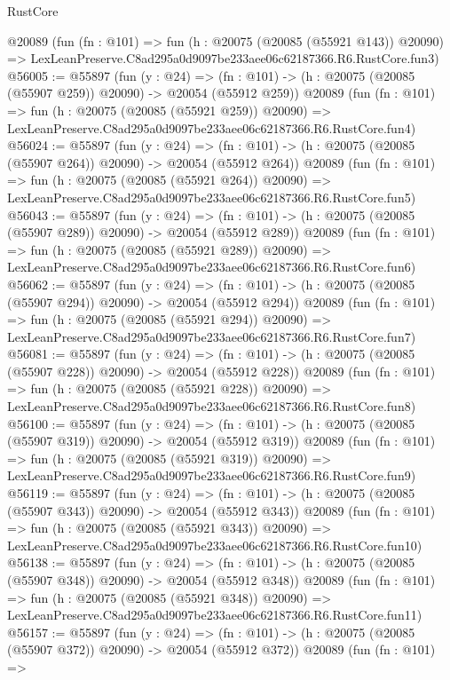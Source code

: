 \begin{lexlean}{RustCore}
\begin{coremodule}
    @20089
    (fun (fn : @101) =>
    fun (h : @20075 (@20085 (@55921 @143)) @20090) =>
    LexLeanPreserve.C8ad295a0d9097be233aee06c62187366.R6.RustCore.fun3)
@56005 := @55897
    (fun (y : @24) =>
    (fn : @101) -> (h : @20075 (@20085 (@55907 @259)) @20090) -> @20054 (@55912 @259))
    @20089
    (fun (fn : @101) =>
    fun (h : @20075 (@20085 (@55921 @259)) @20090) =>
    LexLeanPreserve.C8ad295a0d9097be233aee06c62187366.R6.RustCore.fun4)
@56024 := @55897
    (fun (y : @24) =>
    (fn : @101) -> (h : @20075 (@20085 (@55907 @264)) @20090) -> @20054 (@55912 @264))
    @20089
    (fun (fn : @101) =>
    fun (h : @20075 (@20085 (@55921 @264)) @20090) =>
    LexLeanPreserve.C8ad295a0d9097be233aee06c62187366.R6.RustCore.fun5)
@56043 := @55897
    (fun (y : @24) =>
    (fn : @101) -> (h : @20075 (@20085 (@55907 @289)) @20090) -> @20054 (@55912 @289))
    @20089
    (fun (fn : @101) =>
    fun (h : @20075 (@20085 (@55921 @289)) @20090) =>
    LexLeanPreserve.C8ad295a0d9097be233aee06c62187366.R6.RustCore.fun6)
@56062 := @55897
    (fun (y : @24) =>
    (fn : @101) -> (h : @20075 (@20085 (@55907 @294)) @20090) -> @20054 (@55912 @294))
    @20089
    (fun (fn : @101) =>
    fun (h : @20075 (@20085 (@55921 @294)) @20090) =>
    LexLeanPreserve.C8ad295a0d9097be233aee06c62187366.R6.RustCore.fun7)
@56081 := @55897
    (fun (y : @24) =>
    (fn : @101) -> (h : @20075 (@20085 (@55907 @228)) @20090) -> @20054 (@55912 @228))
    @20089
    (fun (fn : @101) =>
    fun (h : @20075 (@20085 (@55921 @228)) @20090) =>
    LexLeanPreserve.C8ad295a0d9097be233aee06c62187366.R6.RustCore.fun8)
@56100 := @55897
    (fun (y : @24) =>
    (fn : @101) -> (h : @20075 (@20085 (@55907 @319)) @20090) -> @20054 (@55912 @319))
    @20089
    (fun (fn : @101) =>
    fun (h : @20075 (@20085 (@55921 @319)) @20090) =>
    LexLeanPreserve.C8ad295a0d9097be233aee06c62187366.R6.RustCore.fun9)
@56119 := @55897
    (fun (y : @24) =>
    (fn : @101) -> (h : @20075 (@20085 (@55907 @343)) @20090) -> @20054 (@55912 @343))
    @20089
    (fun (fn : @101) =>
    fun (h : @20075 (@20085 (@55921 @343)) @20090) =>
    LexLeanPreserve.C8ad295a0d9097be233aee06c62187366.R6.RustCore.fun10)
@56138 := @55897
    (fun (y : @24) =>
    (fn : @101) -> (h : @20075 (@20085 (@55907 @348)) @20090) -> @20054 (@55912 @348))
    @20089
    (fun (fn : @101) =>
    fun (h : @20075 (@20085 (@55921 @348)) @20090) =>
    LexLeanPreserve.C8ad295a0d9097be233aee06c62187366.R6.RustCore.fun11)
@56157 := @55897
    (fun (y : @24) =>
    (fn : @101) -> (h : @20075 (@20085 (@55907 @372)) @20090) -> @20054 (@55912 @372))
    @20089
    (fun (fn : @101) =>

\end{coremodule}
\end{lexlean}
